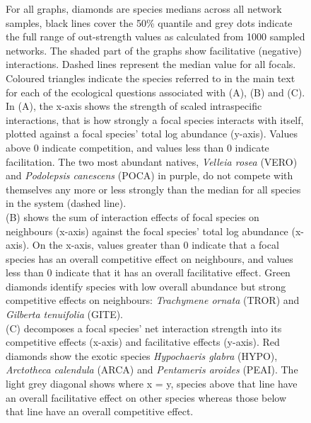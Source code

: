 \documentclass[a4,12pt]{article}
\begin{document}
    \addtocounter{figure}{-1}
    \begin{figure} [t!]
        \caption{For all graphs, diamonds are species medians across all network samples, black lines cover the 50\% quantile and grey dots indicate the full range of out-strength values as calculated from 1000 sampled networks. The shaded part of the graphs show facilitative (negative) interactions. Dashed lines represent the median value for all focals. Coloured triangles indicate the species referred to in the main text for each of the ecological questions associated with (A), (B) and (C). \\
        In (A), the x-axis shows the strength of scaled intraspecific interactions, that is how strongly a focal species interacts with itself, plotted against a focal species' total log abundance (y-axis). Values above $0$ indicate competition, and values less than $0$ indicate facilitation.  The two most abundant natives, \textit{Velleia rosea} (VERO) and \textit{Podolepsis canescens} (POCA) in purple, do not compete with themselves any more or less strongly than the median for all species in the system (dashed line). \\
        (B) shows the sum of interaction effects of focal species on neighbours (x-axis) against the focal species' total log abundance (x-axis). On the x-axis, values greater than $0$ indicate that a focal species has an overall competitive effect on neighbours, and values less than $0$ indicate that it has an overall facilitative effect. Green diamonds identify species with low overall abundance but strong competitive effects on neighbours: \textit{Trachymene ornata} (TROR) and \textit{Gilberta tenuifolia} (GITE). \\
        (C) decomposes a focal species' net interaction strength into its competitive effects (x-axis) and facilitative effects (y-axis). Red diamonds show the exotic species \textit{Hypochaeris glabra} (HYPO), \textit{Arctotheca calendula} (ARCA) and \textit{Pentameris aroides} (PEAI). The light grey diagonal shows where x = y, species above that line have an overall facilitative effect on other species whereas those below that line have an overall competitive effect.} 
    \end{figure}

\clearpage
\newpage




\end{document}
